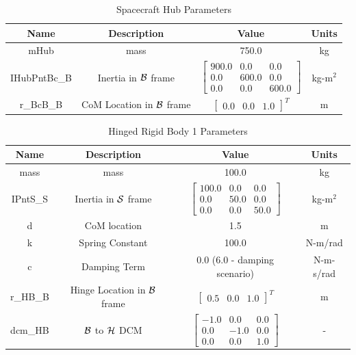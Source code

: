 \begin{table}[htbp]
	\caption{Spacecraft Hub Parameters}
	\label{tab:hub}
	\centering \fontsize{10}{10}\selectfont
	\begin{tabular}{| c | c | c | c |} %
		\hline
		\textbf{Name}  & \textbf{Description}  & \textbf{Value} & \textbf{Units} \\
		\hline
		mHub  & mass & 750.0 & kg \\
		\hline
		IHubPntBc\_B & Inertia in $\cal{B}$ frame & $\begin{bmatrix}
		900.0 & 0.0 & 0.0\\
		0.0 & 600.0 & 0.0\\
		0.0 & 0.0 & 600.0
		\end{bmatrix}$ & kg-m$^2$ \\
		\hline
		r\_BcB\_B & CoM Location in $\cal{B}$ frame & $\begin{bmatrix}
		0.0 & 0.0 & 1.0 \end{bmatrix}^T$ & m \\
		\hline
	\end{tabular}
\end{table}

\begin{table}[htbp]
	\caption{Hinged Rigid Body 1 Parameters}
	\label{tab:panel1}
	\centering \fontsize{10}{10}\selectfont
	\begin{tabular}{| c | c | c | c |} %
		\hline
		\textbf{Name}  & \textbf{Description}  & \textbf{Value} & \textbf{Units} \\
		\hline
		mass  & mass & 100.0 & kg \\
		\hline
		IPntS\_S & Inertia in $\cal{S}$ frame & $\begin{bmatrix}
		100.0 & 0.0 & 0.0\\
		0.0 & 50.0 & 0.0\\
		0.0 & 0.0 & 50.0
		\end{bmatrix}$ & kg-m$^2$ \\
		\hline
		d & CoM location & 1.5 & m \\
		\hline
		k & Spring Constant & 100.0 & N-m/rad \\
		\hline
		c & Damping Term & 0.0 (6.0 - damping scenario) & N-m-s/rad \\
		\hline
		r\_HB\_B & Hinge Location in $\cal{B}$ frame & $\begin{bmatrix}
		0.5 & 0.0 & 1.0 \end{bmatrix}^T$ & m \\
		\hline
		dcm\_HB & $\cal{B}$ to $\cal{H}$ DCM & $\begin{bmatrix}
		-1.0 & 0.0 & 0.0\\
		0.0 & -1.0 & 0.0\\
		0.0 & 0.0 & 1.0
		\end{bmatrix}$ & - \\
		\hline
	\end{tabular}
\end{table}

